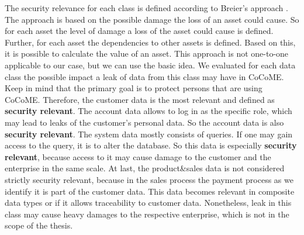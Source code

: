 The security relevance for each class is defined according to Breier's approach \cite{assetValue}. The approach is based on the possible damage the loss of an asset could cause. So for each asset the level of damage a loss of the asset could cause is defined. Further, for each asset the dependencies to other assets is defined. Based on this, it is possible to calculate the value of an asset. This approach is not one-to-one applicable to our case, but we can use the basic idea. We evaluated for each data class the possible impact a leak of data from this class may have in CoCoME. Keep in mind that the primary goal is to protect persons that are using CoCoME. Therefore, the customer data is the most relevant and defined as \textbf{security relevant}. The account data allows to log in as the specific role, which may lead to leaks of the customer's personal data. So the account data is also \textbf{security relevant}. The system data mostly consists of queries. If one may gain access to the query, it is to alter the database. So this data is especially \textbf{security relevant}, because access to it may cause damage to the customer and the enterprise in the same scale. At last, the product\&sales data is not considered strictly security relevant, because in the sales process the payment process as we identify it is part of the customer data. This data becomes relevant in composite data types or if it allows traceability to customer data. Nonetheless, leak in this class may cause heavy damages to the respective enterprise, which is not in the scope of the thesis.
